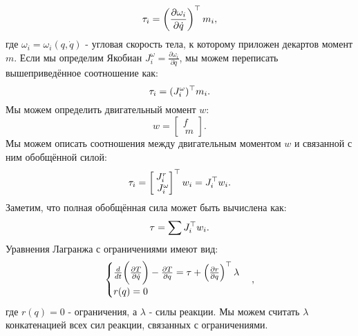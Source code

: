 \begin{equation}
	\tau_i = \left( \frac{\partial \omega_i}{\partial \dot{{q}}} \right)^\top {m}_i,
\end{equation}
%
где $\omega_i = \omega_i({q}, \dot{{q}})$ - угловая скорость тела, к которому приложен декартов момент ${m}$.
Если мы определим Якобиан ${J}^\omega_i = \frac{\partial \omega_i}{\partial \dot{{q}}}$, мы можем переписать вышеприведённое соотношение как:
%
\begin{equation}
\tau_i = ({J}^\omega_i)^\top {m}_i.
\end{equation}
Мы можем определить двигательный момент ${w}$:
\begin{equation}
	{w} = \begin{bmatrix}
		{f} \\\ {m}
	\end{bmatrix}.
\end{equation}
%
Мы можем описать соотношения между двигательным моментом ${w}$ и связанной с ним обобщённой силой:
%
\begin{equation}
	\tau_i = \begin{bmatrix}
		{J}^r_i \\\ {J}^\omega_i
	\end{bmatrix}^\top
	{w}_i
	=
	{J}_i^\top {w}_i.
\end{equation}
Заметим, что полная обобщённая сила может быть вычислена как:
%
\begin{equation}
	\tau = \sum {J}_i^\top {w}_i.
\end{equation}
%
Уравнения Лагранжа с ограничениями имеют вид:
%
\begin{equation}
	\begin{cases}
		\frac{d}{dt} \bigg( 
		\frac{\partial T }{\partial \dot{{q}}}
		\bigg) - 
		\frac{\partial T }{\partial {q}} = \tau + \left( \frac{\partial {r}}{\partial {q}} \right)^\top \lambda
		\\
		{r}({q}) = 0
	\end{cases},
\end{equation}
%
где ${r}({q}) = 0$ - ограничения, а $\lambda$ - силы реакции. Мы можем считать $\lambda$ конкатенацией всех сил реакции, связанных с ограничениями.

